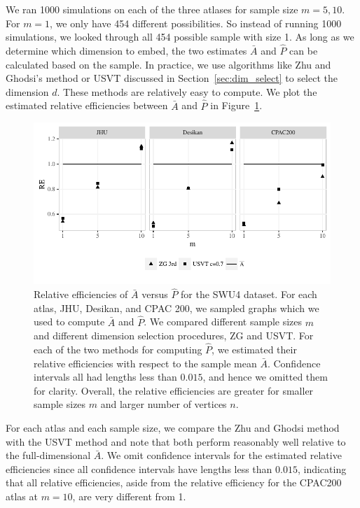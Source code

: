 We ran 1000 simulations on each of the three atlases for sample size $m=5, 10$. For $m=1$, we only have 454 different possibilities. So instead of running 1000 simulations, we looked through all 454 possible sample with size 1. As long as we determine which dimension to embed, the two estimates $\bar{A}$ and $\hat{P}$ can be calculated based on the sample.
In practice, we use algorithms like Zhu and Ghodsi's method or USVT discussed in Section~\ref{sec:dim_select} to select the dimension $d$. These methods are relatively easy to compute.
We plot the estimated relative efficiencies between $\bar{A}$ and $\hat{P}$ in Figure~\ref{fig:corr_re}.

\begin{figure}
\begin{center}
\includegraphics[width=1\linewidth]{./Figures/corr_data_REdiff.pdf}
\end{center}
\caption[Relative efficiencies of two estimators for the SWU4 dataset]{Relative efficiencies of $\bar{A}$ versus $\hat{P}$ for the SWU4 dataset.
For each atlas, JHU, Desikan, and CPAC 200, we sampled graphs which we used to compute $\bar{A}$ and $\hat{P}$.
We compared different sample sizes $m$ and different dimension selection procedures, ZG and USVT.
For each of the two methods for computing $\hat{P}$, we estimated their relative efficiencies with respect to the sample mean $\bar{A}$.
Confidence intervals all had lengths less than $0.015$, and hence we omitted them for clarity.
Overall, the relative efficiencies are greater for smaller sample sizes $m$ and larger number of vertices $n$.} 
\label{fig:corr_re}
\end{figure}

For each atlas and each sample size, we compare the Zhu and Ghodsi method \citep{zhu2006automatic} with the USVT method \citep{chatterjee2015matrix} and note that both perform reasonably well relative to the full-dimensional $\bar{A}$.
We omit confidence intervals for the estimated relative efficiencies since all confidence intervals have lengths less than $0.015$, indicating that all relative efficiencies, aside from the relative efficiency for the CPAC200 atlas at $m=10$, are very different from 1.

